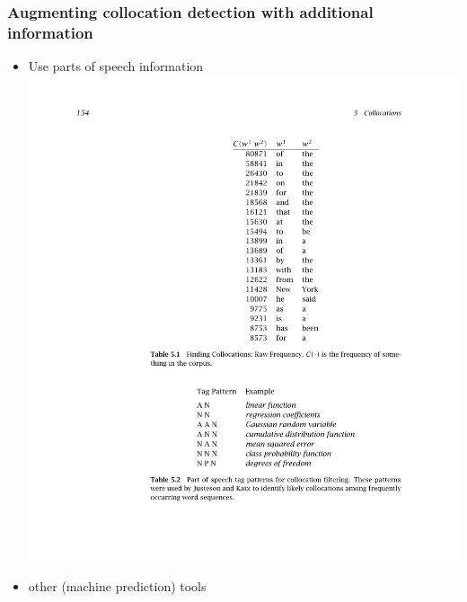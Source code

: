 \documentclass[11pt,handout]{beamer}
\begin{document}

\begin{frame}
 \frametitle{Augmenting collocation detection with additional
 information}
 \begin{itemize}
  \item Use parts of speech information
        \includegraphics[width=.9\textwidth]{MStable52.pdf}
  \item other (machine prediction) tools
 \end{itemize}
\end{frame}
\end{document}
